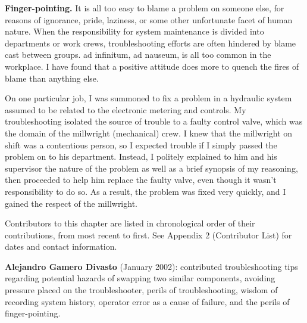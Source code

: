 {\bf Finger-pointing.} It is all too easy to blame a problem on someone
else, for reasons of ignorance, pride, laziness, or some other
unfortunate facet of human nature. When the responsibility for system
maintenance is divided into departments or work crews, troubleshooting
efforts are often hindered by blame cast between groups.  ad infinitum, ad nauseum, is all too common
in the workplace. I have found that a positive attitude does more to
quench the fires of blame than anything else.

On one particular job, I was summoned to fix a problem in a hydraulic
system assumed to be related to the electronic metering and controls. My
troubleshooting isolated the source of trouble to a faulty control
valve, which was the domain of the millwright (mechanical) crew. I knew
that the millwright on shift was a contentious person, so I expected
trouble if I simply passed the problem on to his department. Instead, I
politely explained to him and his supervisor the nature of the problem
as well as a brief synopsis of my reasoning, then proceeded to help him
replace the faulty valve, even though it wasn't 
responsibility to do so. As a result, the problem was fixed very
quickly, and I gained the respect of the millwright.

\stopsection

\startsection[title={Contributors},reference={sec:xtocid157909726}]

Contributors to this chapter are listed in chronological order of their
contributions, from most recent to first. See Appendix 2 (Contributor
List) for dates and contact information.

{\bf Alejandro Gamero Divasto} (January 2002): contributed
troubleshooting tips regarding potential hazards of swapping two similar
components, avoiding pressure placed on the troubleshooter, perils of
 troubleshooting, wisdom of recording system history,
operator error as a cause of failure, and the perils of finger-pointing.

\stopsection

\stopchapter

